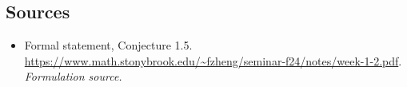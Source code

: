 \documentclass[11pt]{article}
\begin{document}
\subsection{Sources}
\begin{itemize}
\item[S1]Formal statement, Conjecture 1.5.
\url{https://www.math.stonybrook.edu/~fzheng/seminar-f24/notes/week-1-2.pdf}.
\textit{Formulation source.}
\end{itemize}
\end{document}
